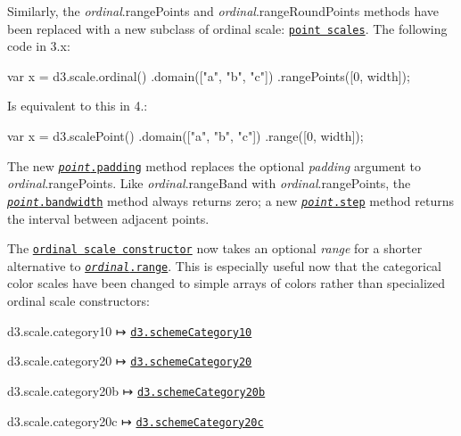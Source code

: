 Similarly, the {\itshape ordinal}.range\+Points and {\itshape ordinal}.range\+Round\+Points methods have been replaced with a new subclass of ordinal scale\+: \href{https://github.com/d3/d3-scale/blob/master/README.md#point-scales}{\tt point scales}. The following code in 3.\+x\+:


\begin{DoxyCode}
var x = d3.scale.ordinal()
    .domain(["a", "b", "c"])
    .rangePoints([0, width]);
\end{DoxyCode}


Is equivalent to this in 4.\+:


\begin{DoxyCode}
var x = d3.scalePoint()
    .domain(["a", "b", "c"])
    .range([0, width]);
\end{DoxyCode}


The new \href{https://github.com/d3/d3-scale/blob/master/README.md#point_padding}{\tt {\itshape point}.padding} method replaces the optional {\itshape padding} argument to {\itshape ordinal}.range\+Points. Like {\itshape ordinal}.range\+Band with {\itshape ordinal}.range\+Points, the \href{https://github.com/d3/d3-scale/blob/master/README.md#point_bandwidth}{\tt {\itshape point}.bandwidth} method always returns zero; a new \href{https://github.com/d3/d3-scale/blob/master/README.md#point_step}{\tt {\itshape point}.step} method returns the interval between adjacent points.

The \href{https://github.com/d3/d3-scale/blob/master/README.md#ordinal-scales}{\tt ordinal scale constructor} now takes an optional {\itshape range} for a shorter alternative to \href{https://github.com/d3/d3-scale/blob/master/README.md#ordinal_range}{\tt {\itshape ordinal}.range}. This is especially useful now that the categorical color scales have been changed to simple arrays of colors rather than specialized ordinal scale constructors\+:


\begin{DoxyItemize}
\item d3.\+scale.\+category10 ↦ \href{https://github.com/d3/d3-scale/blob/master/README.md#schemeCategory10}{\tt d3.\+scheme\+Category10}
\item d3.\+scale.\+category20 ↦ \href{https://github.com/d3/d3-scale/blob/master/README.md#schemeCategory20}{\tt d3.\+scheme\+Category20}
\item d3.\+scale.\+category20b ↦ \href{https://github.com/d3/d3-scale/blob/master/README.md#schemeCategory20b}{\tt d3.\+scheme\+Category20b}
\item d3.\+scale.\+category20c ↦ \href{https://github.com/d3/d3-scale/blob/master/README.md#schemeCategory20c}{\tt d3.\+scheme\+Category20c}
\end{DoxyItemize}

